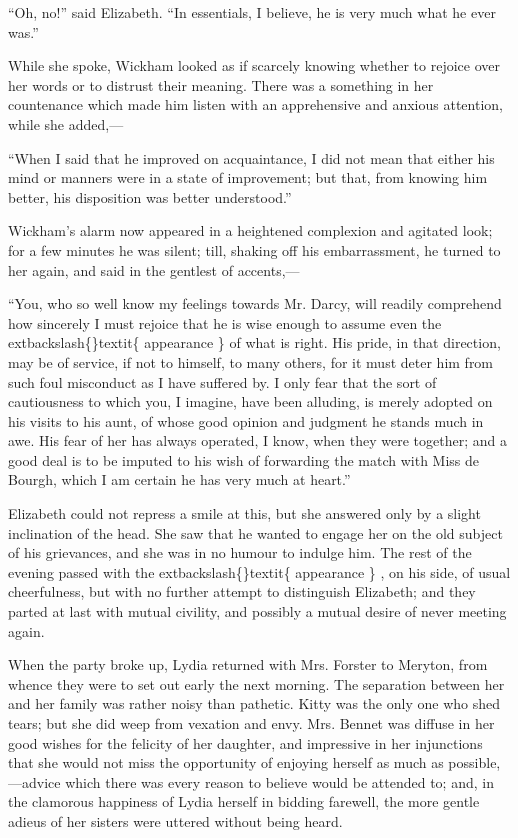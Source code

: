 \documentclass[10pt]{book}
\begin{document}
   “Oh, no!” said Elizabeth. “In essentials, I believe, he is very much
what he ever was.”
  

   While she spoke, Wickham looked as if scarcely knowing whether to
rejoice over her words or to distrust their meaning. There was a
something in her countenance which made him listen with an apprehensive
and anxious attention, while she added,—
  

   “When I said that he improved on acquaintance, I did not mean that
either his mind or manners were in a state of improvement; but that,
from knowing him better, his disposition was better understood.”
  

   Wickham’s alarm now appeared in a heightened complexion and agitated
look; for a few minutes he was silent; till, shaking off his
embarrassment, he turned to her again, and said in the gentlest of
accents,—
  

   “You, who so well know my feelings towards Mr. Darcy, will readily
comprehend how sincerely I must rejoice that he is wise enough to assume
even the
   	extbackslash\{\}textit\{
    appearance
   \}
   of what is right. His pride, in that direction,
may be of service, if not to himself, to many others, for it must deter
him from such foul misconduct as I have suffered by. I only fear that
the sort of cautiousness to which you, I imagine, have been alluding, is
merely adopted on his visits to his aunt, of whose good opinion and
judgment he stands much in awe. His fear of her has always operated, I
know, when they were together; and a good deal is to be imputed to his
wish of forwarding the match with Miss de Bourgh, which I am certain he
has very much at heart.”
  

   Elizabeth could not repress a smile at this, but she answered only by a
slight inclination of the head. She saw that he wanted to engage her on
the old subject of his grievances, and she was in no humour to indulge
him. The rest of the evening passed with the
   	extbackslash\{\}textit\{
    appearance
   \}
   , on his side,
of usual cheerfulness, but with no further attempt to distinguish
Elizabeth; and they parted at last with mutual civility, and possibly a
mutual desire of never meeting again.
  

   When the party broke up, Lydia returned with Mrs. Forster to Meryton,
from whence they were to set out early the next morning. The separation
between her and her family was rather noisy than pathetic. Kitty was the
only one who shed tears; but she did weep from vexation and envy. Mrs.
Bennet was diffuse in her good wishes for the felicity of her daughter,
and impressive in her injunctions that she would not miss the
opportunity of enjoying herself as much as possible,—advice which there
was every reason to believe would be attended to; and, in the clamorous
happiness of Lydia herself in bidding farewell, the more gentle adieus
of her sisters were uttered without being heard.
  
\end{document}
